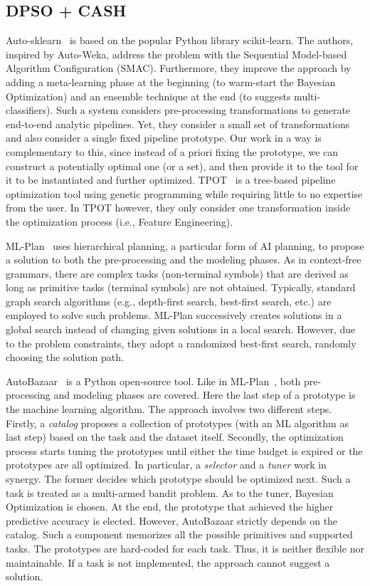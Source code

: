 \subsection{DPSO + CASH}
Auto-sklearn~\cite{Feurer15AutoSklearn} is based on the popular Python library scikit-learn.
The authors, inspired by Auto-Weka, address the problem with the Sequential Model-based Algorithm Configuration (SMAC).
Furthermore, they improve the approach by adding a meta-learning phase at the beginning (to warm-start the Bayesian Optimization) and an ensemble technique at the end (to suggests multi-classifiers).
Such a system considers pre-processing transformations to generate end-to-end analytic pipelines. 
Yet, they consider a small set of transformations and also consider a single fixed pipeline prototype. 
Our work in a way is complementary to this, since instead of a priori fixing the prototype, we can construct a potentially optimal one (or a set), and then provide it to the tool for it to be instantiated and further optimized.
TPOT~\cite{Olson16Tpot} is a tree-based pipeline optimization tool using genetic programming while requiring little to no expertise from the user. In TPOT however, they only consider one transformation inside the optimization process (i.e., Feature Engineering).


ML-Plan~\cite{mohr2018ml} uses hierarchical planning, a particular form of AI planning, to propose a solution to both the pre-processing and the modeling phases. 
As in context-free grammars, there are complex tasks (non-terminal symbols) that are derived as long as primitive tasks (terminal symbols) are not obtained.
Typically, standard graph search algorithms (e.g., depth-first search, best-first search, etc.) are employed to solve such problems.
ML-Plan successively creates solutions in a global search instead of changing given solutions in a local search. However, due to the problem constraints, they adopt a randomized best-first search, randomly choosing the solution path.

AutoBazaar~\cite{AutoBazaar} is a Python open-source tool.
Like in ML-Plan~\cite{mohr2018ml}, both pre-processing and modeling phases are covered.
Here the last step of a prototype is the machine learning algorithm.
The approach involves two different steps.
Firstly, a \textit{catalog} proposes a collection of prototypes (with an ML algorithm as last step) based on the task and the dataset itself.
Secondly, the optimization process starts tuning the prototypes until either the time budget is expired or the prototypes are all optimized.
In particular, a \textit{selector} and a \textit{tuner} work in synergy.
The former decides which prototype should be optimized next.
Such a task is treated as a multi-armed bandit problem.
As to the tuner, Bayesian Optimization is chosen.
At the end, the prototype that achieved the higher predictive accuracy is elected.
However, AutoBazaar strictly depends on the catalog.
Such a component memorizes all the possible primitives and supported tasks.
The prototypes are hard-coded for each task.
Thus, it is neither flexible nor maintainable.
If a task is not implemented, the approach cannot suggest a solution.

